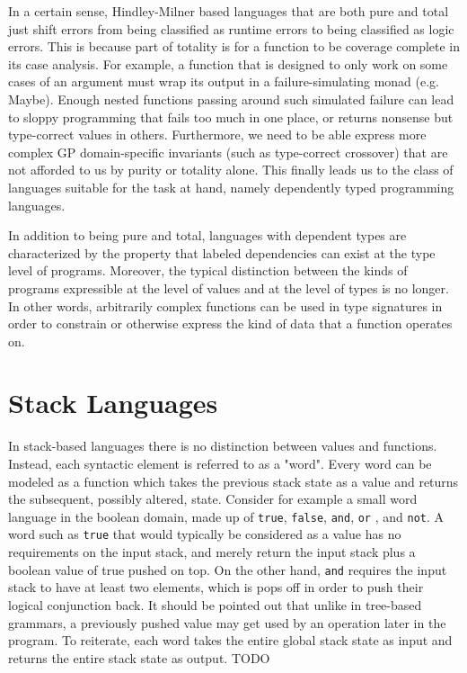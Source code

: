\documentclass{acm_proc_article-sp}
\begin{document}
In a certain sense, Hindley-Milner based languages that are both pure
and total just shift errors from being classified as runtime errors to
being classified as logic errors. This is because part of totality is
for a function to be coverage complete in its case analysis. For
example, a function that is designed to only work on some cases of an
argument must wrap its output in a failure-simulating monad
(e.g. Maybe). Enough nested functions passing around such simulated
failure can lead to sloppy programming that fails too much in one
place, or returns nonsense but type-correct values in
others. Furthermore, we need to be able express more complex GP
domain-specific invariants (such as type-correct crossover) that are
not afforded to us by purity or totality alone. This finally leads us
to the class of languages suitable for the task at hand, namely
dependently typed programming languages.

In addition to being pure and total, languages with dependent types
are characterized by the property that labeled dependencies can exist
at the type level of programs. Moreover, the typical distinction
between the kinds of programs expressible at the level of values and
at the level of types is no longer. In other words, arbitrarily
complex functions can be used in type signatures in order to constrain
or otherwise express the kind of data that a function operates on.

\section{Stack Languages}

In stack-based languages \cite{kelly:forth} there is no
distinction between values and functions. Instead, each syntactic
element is referred to as a "word". Every word can be modeled as a
function which takes the previous stack state as a value and returns
the subsequent, possibly altered, state. Consider for example a
small word language in the boolean domain, made up of \texttt{true},
\texttt{false}, \texttt{and}, \texttt{or} , and \texttt{not}. A word
such as \texttt{true} that would typically be considered as a value
has no requirements on the input stack, and merely return the input
stack plus a boolean value of true pushed on top. On the other
hand, \texttt{and} requires the input stack to have at least two elements,
which is pops off in order to push their logical conjunction
back. It should be pointed out that unlike in tree-based grammars, a
previously pushed value may get used by an operation later in the
program. To reiterate, each word takes the entire global stack state
as input and returns the entire stack state as output. TODO
\end{document}
